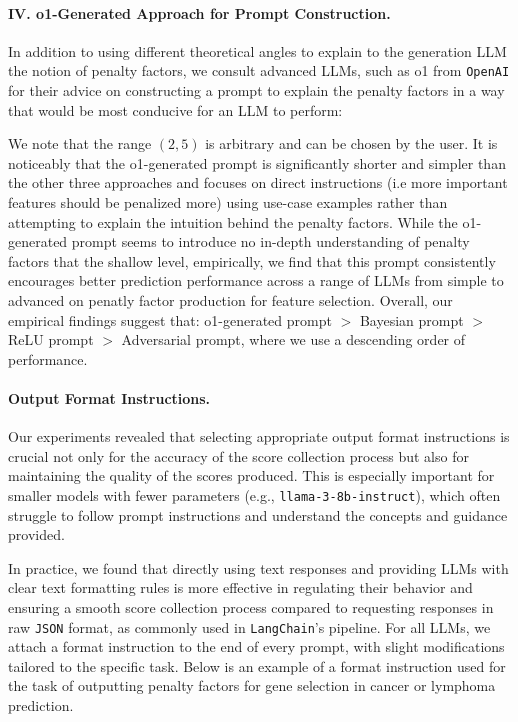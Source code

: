 \paragraph{IV. o1-Generated Approach for Prompt Construction.} In addition to using different theoretical angles to explain to the generation LLM the notion of penalty factors, we consult advanced LLMs, such as o1 from \texttt{OpenAI} for their advice on constructing a prompt to explain the penalty factors in a way that would be most conducive for an LLM to perform:
\begin{center}
\noindent{}
\end{center}
We note that the range $(2,5)$ is arbitrary and can be chosen by the user. It is noticeably that the o1-generated prompt is significantly shorter and simpler than the other three approaches and focuses on direct instructions (i.e more important features should be penalized more) using use-case examples rather than attempting to explain the intuition behind the penalty factors. While the o1-generated prompt seems to introduce no in-depth understanding of penalty factors that the shallow level, empirically, we find that this prompt consistently encourages better prediction performance across a range of LLMs from simple to advanced on penatly factor production for feature selection. Overall, our empirical findings suggest that: o1-generated prompt $>$ Bayesian prompt $>$ ReLU prompt $>$ Adversarial prompt, where we use a descending order of performance.

\paragraph{Output Format Instructions.}
Our experiments revealed that selecting appropriate output format instructions is crucial not only for the accuracy of the score collection process but also for maintaining the quality of the scores produced. This is especially important for smaller models with fewer parameters (e.g., \texttt{llama-3-8b-instruct}), which often struggle to follow prompt instructions and understand the concepts and guidance provided.

In practice, we found that directly using text responses and providing LLMs with clear text formatting rules is more effective in regulating their behavior and ensuring a smooth score collection process compared to requesting responses in raw \texttt{JSON} format, as commonly used in \texttt{LangChain}'s pipeline. For all LLMs, we attach a format instruction to the end of every prompt, with slight modifications tailored to the specific task. Below is an example of a format instruction used for the task of outputting penalty factors for gene selection in cancer or lymphoma prediction.

